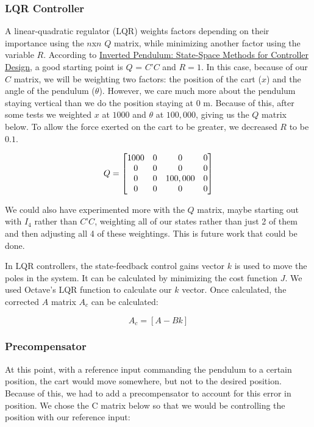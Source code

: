 \documentclass{article}
\begin{document}
\subsubsection{LQR Controller}
A linear-quadratic regulator (LQR) weights factors depending on their importance using the $n$x$n$ $Q$ matrix, while minimizing another factor using the variable $R$. According to \href{http://ctms.engin.umich.edu/CTMS/index.php?example=InvertedPendulum&section=ControlStateSpace}{Inverted Pendulum: State-Space Methods for Controller Design}, a good starting point is $Q$ = $C$'$C$ and $R = 1$. In this case, because of our $C$ matrix, we will be weighting two factors: the position of the cart ($x$) and the angle of the pendulum ($\theta$). However, we care much more about the pendulum staying vertical than we do the position staying at 0 m. Because of this, after some tests we weighted $x$ at $1000$ and $\theta$ at $100,000$, giving us the $Q$ matrix below. To allow the force exerted on the cart to be greater, we decreased $R$ to be $0.1$.

 \begin{equation} 
\label{q}
\centering
Q = \begin{bmatrix}
	1000&0&0&0\\
	0&0&0&0\\
	0&0&100,000&0\\
	0&0&0&0\\
	\end{bmatrix}
\end{equation}

We could also have experimented more with the $Q$ matrix, maybe starting out with $I_4$ rather than $C$'$C$, weighting all of our states rather than just 2 of them and then adjusting all 4 of these weightings. This is future work that could be done.

In LQR controllers, the state-feedback control gains vector $k$ is used to move the poles in the system. It can be calculated by minimizing the cost function $J$. We used Octave's LQR function to calculate our $k$ vector. Once calculated, the corrected $A$ matrix $A_c$ can be calculated:

\begin{equation}
\label{ac}
A_c=[A-Bk]
\end{equation}

\subsubsection{Precompensator}
At this point, with a reference input commanding the pendulum to a certain position, the cart would move somewhere, but not to the desired position. Because of this, we had to add a precompensator to account for this error in position. We chose the C matrix below so that we would be controlling the position with our reference input:
\\
\end{document}
